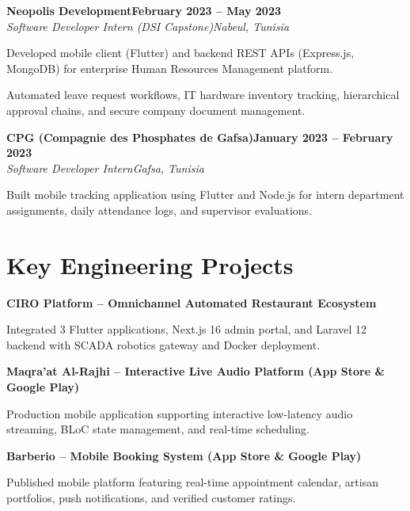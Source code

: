 \documentclass[letterpaper,10pt]{article}
\newcommand{\heading}[2]{\hspace{10pt}#1\hfill#2\\}
\newcommand{\headingBf}[2]{\heading{\textbf{#1}}{\textbf{#2}}}
\newcommand{\headingIt}[2]{\heading{\textit{#1}}{\textit{#2}}}
\newenvironment{resume_list}{
  \vspace{-7pt}
  \begin{itemize}[itemsep=-2pt, parsep=1pt, leftmargin=30pt]
}{
  \end{itemize}
}
\begin{document}
\headingBf{Neopolis Development}{February 2023 -- May 2023}
\headingIt{Software Developer Intern (DSI Capstone)}{Nabeul, Tunisia}
\begin{resume_list}
  \item Developed mobile client (Flutter) and backend REST APIs (Express.js, MongoDB) for enterprise Human Resources Management platform.
  \item Automated leave request workflows, IT hardware inventory tracking, hierarchical approval chains, and secure company document management.
\end{resume_list}

\headingBf{CPG (Compagnie des Phosphates de Gafsa)}{January 2023 -- February 2023}
\headingIt{Software Developer Intern}{Gafsa, Tunisia}
\begin{resume_list}
  \item Built mobile tracking application using Flutter and Node.js for intern department assignments, daily attendance logs, and supervisor evaluations.
\end{resume_list}

\section{Key Engineering Projects}

\headingBf{CIRO Platform -- Omnichannel Automated Restaurant Ecosystem}{}
\begin{resume_list}
  \item Integrated 3 Flutter applications, Next.js 16 admin portal, and Laravel 12 backend with SCADA robotics gateway and Docker deployment.
\end{resume_list}

\headingBf{Maqra'at Al-Rajhi -- Interactive Live Audio Platform (App Store \& Google Play)}{}
\begin{resume_list}
  \item Production mobile application supporting interactive low-latency audio streaming, BLoC state management, and real-time scheduling.
\end{resume_list}

\headingBf{Barberio -- Mobile Booking System (App Store \& Google Play)}{}
\begin{resume_list}
  \item Published mobile platform featuring real-time appointment calendar, artisan portfolios, push notifications, and verified customer ratings.
\end{resume_list}
\end{document}
